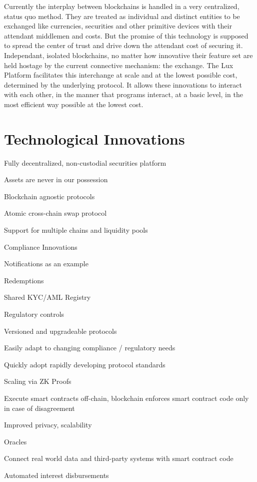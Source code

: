 \documentclass[11pt]{article}
\begin{document}
Currently the interplay between blockchains is handled in a very centralized, status quo method.  They are treated as individual and distinct entities to be exchanged like currencies, securities and other primitive devices with their attendant middlemen and costs. But the promise of this technology is supposed to spread the center of trust and drive down the attendant cost of securing it. Independant, isolated blockchains, no matter how innovative their feature set are held hostage by the current connective mechanism: the exchange. The Lux Platform facilitates this interchange at scale and at the lowest possible cost, determined by the underlying protocol. It allows these innovations to interact with each other, in the manner that programs interact, at a basic level, in the most efficient way possible at the lowest cost.


\section{Technological Innovations}

Fully decentralized, non-custodial securities platform


Assets are never in our possession


Blockchain agnostic protocols


Atomic cross-chain swap protocol


Support for multiple chains and liquidity pools


Compliance Innovations


Notifications as an example


Redemptions


Shared  KYC/AML Registry


Regulatory controls


Versioned and upgradeable protocols


Easily adapt to changing compliance / regulatory needs


Quickly adopt rapidly developing protocol standards


Scaling via ZK Proofs


Execute smart contracts off-chain, blockchain enforces smart contract code only in case of disagreement


Improved privacy, scalability


Oracles


Connect real world data and third-party systems with smart contract code


Automated interest disbursements
\end{document}
